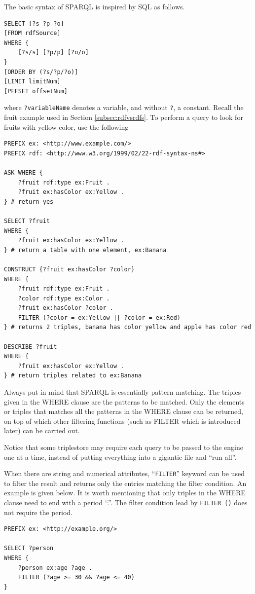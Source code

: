 The basic syntax of SPARQL is inspired by SQL as follows.
\begin{lstlisting}
SELECT [?s ?p ?o]
[FROM rdfSource]
WHERE {
	[?s/s] [?p/p] [?o/o]
}
[ORDER BY (?s/?p/?o)]
[LIMIT limitNum]
[PFFSET offsetNum]
\end{lstlisting}
where \verb|?variableName| denotes a variable, and without \verb|?|, a constant. Recall the fruit example used in Section \ref{subsec:rdfvsrdfs}. To perform a query to look for fruits with yellow color, use the following
\begin{lstlisting}
PREFIX ex: <http://www.example.com/>
PREFIX rdf: <http://www.w3.org/1999/02/22-rdf-syntax-ns#>

ASK WHERE {
	?fruit rdf:type ex:Fruit .
	?fruit ex:hasColor ex:Yellow .
} # return yes

SELECT ?fruit
WHERE {
	?fruit ex:hasColor ex:Yellow .
} # return a table with one element, ex:Banana

CONSTRUCT {?fruit ex:hasColor ?color}
WHERE {
	?fruit rdf:type ex:Fruit .
	?color rdf:type ex:Color .
	?fruit ex:hasColor ?color .
	FILTER (?color = ex:Yellow || ?color = ex:Red)
} # returns 2 triples, banana has color yellow and apple has color red

DESCRIBE ?fruit
WHERE {
	?fruit ex:hasColor ex:Yellow .
} # return triples related to ex:Banana
\end{lstlisting}

Always put in mind that SPARQL is essentially pattern matching. The triples given in the WHERE clause are the patterns to be matched. Only the elements or triples that matches all the patterns in the WHERE clause can be returned, on top of which other filtering functions (such as FILTER which is introduced later) can be carried out.

Notice that some triplestore may require each query to be passed to the engine one at a time, instead of putting everything into a gigantic file and ``run all''.

When there are string and numerical attributes, ``\verb|FILTER|'' keyword can be used to filter the result and returns only the entries matching the filter condition. An example is given below. It is worth mentioning that only triples in the WHERE clause need to end with a period ``.''. The filter condition lead by \verb|FILTER ()| does not require the period.
\begin{lstlisting}
PREFIX ex: <http://example.org/>

SELECT ?person
WHERE {
	?person ex:age ?age .
	FILTER (?age >= 30 && ?age <= 40)
}
\end{lstlisting}

